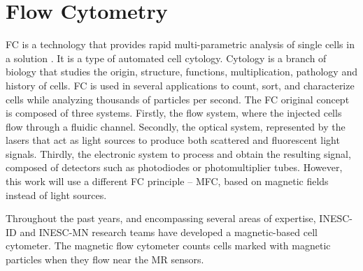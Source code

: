 
\label{chapter:mfc}

\clearpage

\section{Flow Cytometry}
\label{section:mfc-fc}

\ac{FC} is a technology that provides rapid multi-parametric analysis of single cells in a solution \cite{cpim.40}. It is a type of automated cell cytology. Cytology is a branch of biology that studies the origin, structure, functions, multiplication, pathology and history of cells. \ac{FC} is used in several applications to count, sort, and characterize cells while analyzing thousands of particles per second. The \ac{FC} original concept is composed of three systems. Firstly, the flow system, where the injected cells flow through a fluidic channel. Secondly, the optical system, represented by the lasers that act as light sources to produce both scattered and fluorescent light signals. Thirdly, the electronic system to process and obtain the resulting signal, composed of detectors such as photodiodes or photomultiplier tubes. However, this work will use a different \ac{FC} principle -- \ac{MFC}, based on magnetic fields instead of light sources.

Throughout the past years, and encompassing several areas of expertise, \ac{INESC-ID} and \ac{INESC-MN} research teams have developed a magnetic-based cell cytometer. The magnetic flow cytometer counts cells marked with magnetic particles when they flow near the \ac{MR} sensors.

